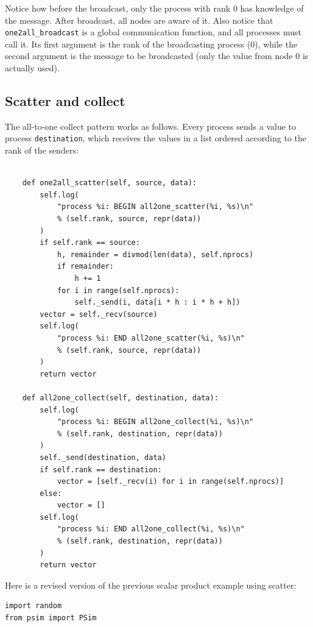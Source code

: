 \documentclass[justified, sixbynine]{tufte-book}
\def\ft{\small\tt}
\theoremstyle{plain}%
\newtheorem * {corollary}{Corollary}
\theoremstyle{definition}
\theoremstyle{remark}
\newtheorem * {remark}{Remark}
\newtheorem * {note}{Note}
\begin{document}
\begin{fullwidth}
Notice how before the broadcast, only the process with rank 0 has knowledge of the message. After broadcast, all nodes are aware of it. Also notice that {\ft one2all\_broadcast} is a global communication function, and all processes must call it. Its first argument is the rank of the broadcasting process (0), while the second argument is the message to be broadcasted (only the value from node 0 is actually used).

\goodbreak\subsection{Scatter and collect}

The all-to-one collect pattern works as follows. Every process sends a value to process {\ft destination}, which receives the values in a list ordered according to the rank of the senders:

\begin{lstlisting}[caption={in file: {\ft psim.py}}]

    def one2all_scatter(self, source, data):
        self.log(
            "process %i: BEGIN all2one_scatter(%i, %s)\n"
            % (self.rank, source, repr(data))
        )
        if self.rank == source:
            h, remainder = divmod(len(data), self.nprocs)
            if remainder:
                h += 1
            for i in range(self.nprocs):
                self._send(i, data[i * h : i * h + h])
        vector = self._recv(source)
        self.log(
            "process %i: END all2one_scatter(%i, %s)\n"
            % (self.rank, source, repr(data))
        )
        return vector

    def all2one_collect(self, destination, data):
        self.log(
            "process %i: BEGIN all2one_collect(%i, %s)\n"
            % (self.rank, destination, repr(data))
        )
        self._send(destination, data)
        if self.rank == destination:
            vector = [self._recv(i) for i in range(self.nprocs)]
        else:
            vector = []
        self.log(
            "process %i: END all2one_collect(%i, %s)\n"
            % (self.rank, destination, repr(data))
        )
        return vector
\end{lstlisting}

Here is a revised version of the previous scalar product example using scatter:

\begin{lstlisting}[caption={in file: {\ft psim\_scalar2.py}}]
import random
from psim import PSim


\end{lstlisting}
\end{fullwidth}
\end{document}
